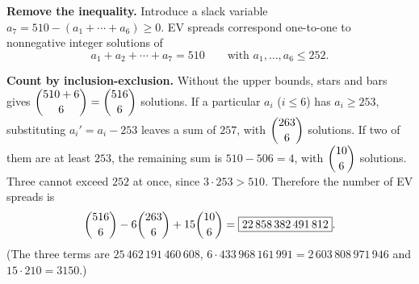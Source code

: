 \textbf{Remove the inequality.} Introduce a slack variable $a_7=510-(a_1+\cdots+a_6)\ge0$. EV spreads correspond one-to-one to nonnegative integer solutions of
\[
a_1+a_2+\cdots+a_7=510\qquad\text{with }a_1,\dots,a_6\le252 .
\]

\textbf{Count by inclusion-exclusion.} Without the upper bounds, stars and bars gives $\dbinom{510+6}{6}=\dbinom{516}{6}$ solutions. If a particular $a_i$ ($i\le6$) has $a_i\ge253$, substituting $a_i'=a_i-253$ leaves a sum of $257$, with $\dbinom{263}{6}$ solutions. If two of them are at least $253$, the remaining sum is $510-506=4$, with $\dbinom{10}{6}$ solutions. Three cannot exceed $252$ at once, since $3\cdot253>510$. Therefore the number of EV spreads is
\[
\dbinom{516}{6}-6\dbinom{263}{6}+15\dbinom{10}{6}=\boxed{22\,858\,382\,491\,812}.
\]
(The three terms are $25\,462\,191\,460\,608$, $6\cdot433\,968\,161\,991=2\,603\,808\,971\,946$ and $15\cdot210=3150$.)
